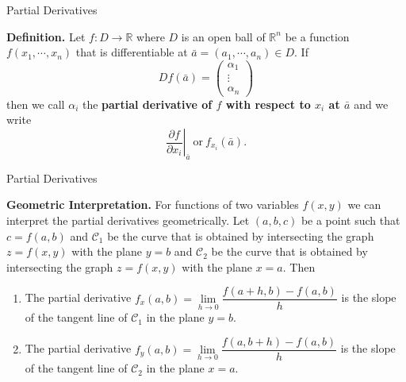 \documentclass[aspectratio=169, UTF8]{ctexbeamer}
\begin{document}
    \begin{frame}[t]{Partial Derivatives}
        \begin{block}
            \par \textbf{Definition.} Let $f: D \to \mathbb{R}$ where $D$ is an open ball of $\mathbb{R}^n$ be a function $f(x_1, \cdots, x_n)$ that is differentiable at $\bar{a} = (a_1, \cdots, a_n) \in D$. If 
            \begin{equation*}
                D f(\bar{a})=\left(\begin{array}{c}
                \alpha_{1} \\
                \vdots \\
                \alpha_{n}
                \end{array}\right)
            \end{equation*}
            then we call $\alpha_i$ the \textbf{partial derivative of $f$ with respect to $x_i$ at $\bar{a}$} and we write
            \begin{equation*}
                \left. \dfrac{\partial f}{\partial x_i} \right|_{\bar{a}} \ \text{or} \ f_{x_i} (\bar{a}) .
            \end{equation*}
        \end{block}
    \end{frame}

    \begin{frame}[t]{Partial Derivatives}
        \par \textbf{Geometric Interpretation.} For functions of two variables $f(x,y)$ we can interpret the partial derivatives geometrically. Let $(a,b,c)$ be a point such that $c = f(a,b)$ and $\mathcal{C}_1$ be the curve that is obtained by intersecting the graph $z = f(x,y)$ with the plane $y = b$ and $\mathcal{C}_2$ be the curve that is obtained by intersecting the graph $z = f(x,y)$ with the plane $x = a$. Then 
        \begin{enumerate}
            \item The partial derivative $f_x (a,b) = \lim\limits_{h \to 0} \dfrac{f(a+h,b) - f(a,b)}{h}$ is the slope of the tangent line of $\mathcal{C}_1$ in the plane $y = b$.
            \item The partial derivative $f_y (a,b) = \lim\limits_{h \to 0} \dfrac{f(a,b+h) - f(a,b)}{h}$ is the slope of the tangent line of $\mathcal{C}_2$ in the plane $x = a$.
        \end{enumerate}
    \end{frame}
\end{document}
